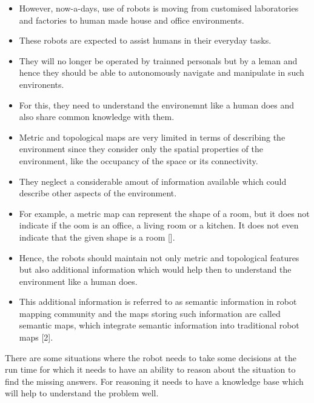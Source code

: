 \begin{itemize}
 \item However, now-a-days, use of robots is moving from customised laboratories and factories to human made house and office environments.
 \item These robots are expected to assist humans in their everyday tasks. 
 \item They will no longer be operated by trainned personals but by a leman and hence they should be able to autonomously navigate and manipulate in such environents.
 \item For this, they need to understand the environemnt like a human does and also share common knowledge with them.
 
 \item Metric and topological maps are very limited in terms of describing the environment since they consider only the spatial properties of the environment, like the occupancy of the space or its connectivity.
 \item They neglect a considerable amout of information available which could describe other aspects of the environment.
 \item For example, a metric map can represent the shape of a room, but it does not indicate if the oom is an office, a living room or a kitchen. It does not even indicate that the given shape is a room [].
 \item Hence, the robots should maintain not only metric and topological features but also additional information which would help then to understand the environment like a human does. 
 \item This additional information is referred to as semantic information in robot mapping community and the maps storing such information are called semantic maps, which integrate semantic information into traditional robot maps [2].
  \end{itemize}

There are some situations where the robot needs to take some decisions at the run
time for which it needs to have an ability to reason about the situation to find the
missing answers. For reasoning it needs to have a knowledge base which will help
to understand the problem well.





